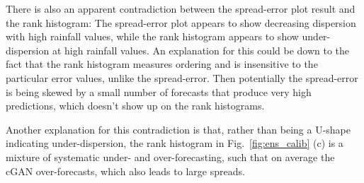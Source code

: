 \documentclass[../main.tex]{subfiles}
\begin{document}
There is also an apparent contradiction between the spread-error plot result and the rank histogram: The spread-error plot appears to show decreasing dispersion with high rainfall values, while the rank histogram appears to show under-dispersion at high rainfall values. An explanation for this could be down to the fact that the rank histogram measures ordering and is insensitive to the particular error values, unlike the spread-error. Then potentially the spread-error is being skewed by a small number of forecasts that produce very high predictions, which doesn't show up on the rank histograms.

Another explanation for this contradiction is that, rather than being a U-shape indicating under-dispersion, the rank histogram in Fig.~\ref{fig:ens_calib} (c) is a mixture of systematic under- and over-forecasting, such that on average the cGAN over-forecasts, which also leads to large spreads.

    




\end{document}

